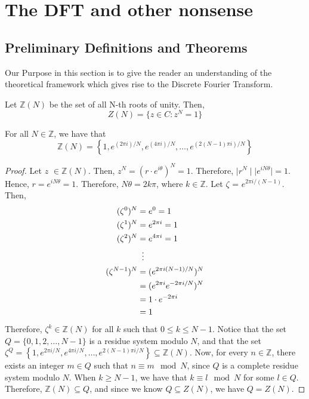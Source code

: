 \documentclass[../article.tex]{subfiles}
\begin{document}
\section{The DFT and other nonsense}

\subsection{Preliminary Definitions and Theorems}
	Our Purpose in this section is to give the reader an understanding of the theoretical framework which gives rise to the Discrete Fourier Transform.

\begin{definition}
Let $\mathbb{Z}(N)$ be the set of all N-th roots of unity. Then,
 \[Z(N) = \{z \in C : z^N = 1 \}\]
\end{definition}
\begin{theorem}
For all $N \in \mathbb{Z}$, we have that
\[\mathbb{Z}(N)= \left\{1, e^{(2 \pi i)/N}, e^{(4 \pi i)/N}, \ldots, e^{(2(N-1) \pi i)/N}\right\}\]
\end{theorem}

\begin{proof}
Let $z$ $\in \mathbb{Z}(N)$. Then, $z^N = (r \cdot e^{i \theta})^N = 1$. Therefore, $\mid r^N \mid \mid e^{i N \theta} \mid = 1$. Hence, $r = e^{i N \theta} = 1$. Therefore, $N\theta = 2k\pi$, where $k \in \mathbb{Z}$. Let $\zeta$ = $e^{2 \pi i /(N-1)}$. Then,
\begin{align*}
	(\zeta^0)^N &= e^0 = 1 \\
	(\zeta^1)^N &= e^{2 \pi i} = 1 \\
	(\zeta^2)^N &= e^{4 \pi i} = 1 \\
	{} &\vdotswithin{=}\\
	(\zeta^{N-1})^N &= (e^{2 \pi i(N-1)/N})^N \\
	{} &= (e^{2 \pi i}e^{-2 \pi i/N})^N \\
	{} &= 1 \cdot e^{-2 \pi i} \\
	{} &= 1
\end{align*}
Therefore, $\zeta^k \in \mathbb{Z}(N)$ for all $k$ such that $0 \leq k \leq N-1$. Notice that the set $Q = \{0, 1, 2, \ldots, N-1\}$ is a residue system modulo $N$, and that the set $\zeta^Q = \left\{1, e^{2 \pi i/N}, e^{4 \pi i/N}, \ldots, e^{2(N-1) \pi i/N}\right\} \subseteq \mathbb{Z}(N) $.
Now, for every $n \in \mathbb{Z}$, there exists an integer $m \in Q$ such that $n \equiv m \mod N$, since $Q$ is a complete residue system modulo $N$. When $k \geq N-1$, we have that $k \equiv l \mod N$ for some $l \in Q$. Therefore, $\mathbb{Z}(N) \subseteq Q$, and since we know $Q \subseteq Z(N)$, we have $Q = Z(N)$.
\end{proof}
\end{document}
